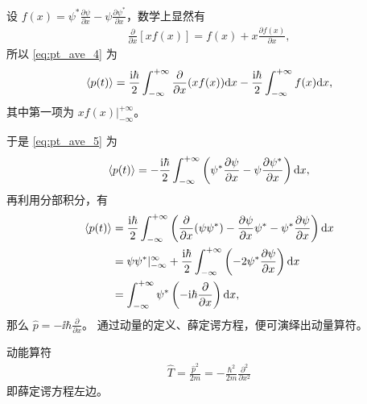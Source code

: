 设 $f(x) = \psi^* \frac{\partial \psi}{\partial x} - \psi \frac{\partial \psi^*}{\partial x}$，数学上显然有
\begin{eqnarray}
    \frac{\partial}{\partial x}[x f(x)] = f(x) + x \frac{\partial f(x)}{\partial x},
\end{eqnarray}
所以 \eqref{eq:pt_ave_4} 为
\begin{eqnarray}
    \langle p(t) \rangle = \frac{\mathrm{i}\hbar}2 \int_{- \infty}^{+ \infty} \frac{\partial}{\partial x}(x f(x)) \mathrm{d} x - \frac{\mathrm{i}\hbar}2 \int_{- \infty}^{+ \infty} f(x) \mathrm{d} x,
    \label{eq:pt_ave_5}
\end{eqnarray}
其中第一项为 $x f(x) |^{+\infty}_{-\infty}$。


于是 \eqref{eq:pt_ave_5} 为
\begin{eqnarray}
    \langle p(t) \rangle = - \frac{\mathrm{i}\hbar}2 \int_{- \infty}^{+ \infty} \left(\psi^* \frac{\partial \psi}{\partial x} - \psi \frac{\partial \psi^*}{\partial x}\right) \mathrm{d} x,
\end{eqnarray}
再利用分部积分，有
\begin{align}
    \langle p(t) \rangle &= \frac{\mathrm{i}\hbar}2 \int_{- \infty}^{+ \infty} \left(\frac{\partial}{\partial x}(\psi\psi^*) - \frac{\partial \psi}{\partial x}\psi^* - \psi^* \frac{\partial \psi}{\partial x}\right) \mathrm{d} x \\
    &= \psi\psi^* |_{-\infty}^{\infty} + \frac{\mathrm{i}\hbar} 2 \int_{- \infty}^{+ \infty} \left(-2\psi^* \frac{\partial \psi} {\partial x} \right)\mathrm{d} x \\
    &= \int_{- \infty}^{+ \infty} \psi^* \left(-\mathrm{i}\hbar \frac{\partial}{\partial x}\right) \mathrm{d} x,
\end{align}
那么 $\hat p = - \ii\hbar \frac{\partial}{\partial x}$。
通过动量的定义、薛定谔方程，便可演绎出动量算符。

动能算符
\begin{eqnarray}
    \hat T = \frac{\hat p^2}{2m} = -\frac{\hbar^2}{2m} \frac{\partial^2}{\partial x^2}
\end{eqnarray}
即薛定谔方程左边。


